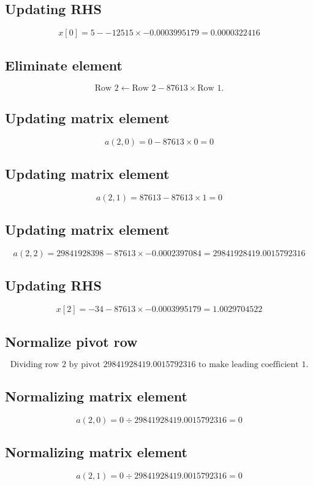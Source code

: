 \documentclass{article}
\begin{document}
\subsection*{ \vspace{1em} Updating RHS}
\[
x[0] = 5 - -12515 \times -0.0003995179 = 0.0000322416
\]
\subsection*{ \vspace{1em} Eliminate element}
\[
\text{Row } 2 \leftarrow \text{Row }2 - 87613 \times \text{Row } 1.
\]
\subsection*{ \vspace{1em} Updating matrix element}
\[
a(2,0 ) = 0 - 87613 \times 0 = 0
\]
\subsection*{ \vspace{1em} Updating matrix element}
\[
a(2,1 ) = 87613 - 87613 \times 1 = 0
\]
\subsection*{ \vspace{1em} Updating matrix element}
\[
a(2,2 ) = 29841928398 - 87613 \times -0.0002397084 = 29841928419.0015792316
\]
\subsection*{ \vspace{1em} Updating RHS}
\[
x[2] = -34 - 87613 \times -0.0003995179 = 1.0029704522
\]
\subsection*{ \vspace{1em} Normalize pivot row}
\[
\text{Dividing row } 2 \text{ by pivot } 29841928419.0015792316 \text{ to make leading coefficient } 1.
\]
\subsection*{ \vspace{1em} Normalizing matrix element}
\[
a( 2,0 ) = 0 \div 29841928419.0015792316 = 0
\]
\subsection*{ \vspace{1em} Normalizing matrix element}
\[
a( 2,1 ) = 0 \div 29841928419.0015792316 = 0
\]
\end{document}
